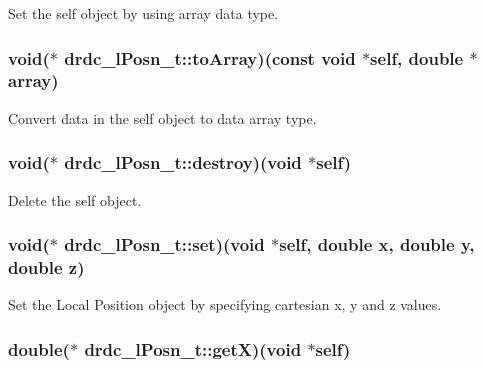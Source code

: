 Set the self object by using array data type. 

\hypertarget{structdrdc__lPosn__t_f5141d0bd5985a7796d54164774817e3}{
\subsubsection[toArray]{\setlength{\rightskip}{0pt plus 5cm}void($\ast$ {\bf drdc\_\-lPosn\_\-t::toArray})(const void $\ast$self, double $\ast$array)}}
\label{structdrdc__lPosn__t_f5141d0bd5985a7796d54164774817e3}


Convert data in the self object to data array type. 

\hypertarget{structdrdc__lPosn__t_e04ff92f3ba6ed312499a748c9000ae2}{
\subsubsection[destroy]{\setlength{\rightskip}{0pt plus 5cm}void($\ast$ {\bf drdc\_\-lPosn\_\-t::destroy})(void $\ast$self)}}
\label{structdrdc__lPosn__t_e04ff92f3ba6ed312499a748c9000ae2}


Delete the self object. 

\hypertarget{structdrdc__lPosn__t_0c5a736a9c88ab1315d2302b99142136}{
\subsubsection[set]{\setlength{\rightskip}{0pt plus 5cm}void($\ast$ {\bf drdc\_\-lPosn\_\-t::set})(void $\ast$self, double x, double y, double z)}}
\label{structdrdc__lPosn__t_0c5a736a9c88ab1315d2302b99142136}


Set the Local Position object by specifying cartesian x, y and z values. 

\hypertarget{structdrdc__lPosn__t_886c2b143bbca8005b9dca2eaefed1f2}{
\subsubsection[getX]{\setlength{\rightskip}{0pt plus 5cm}double($\ast$ {\bf drdc\_\-lPosn\_\-t::getX})(void $\ast$self)}}
\label{structdrdc__lPosn__t_886c2b143bbca8005b9dca2eaefed1f2}


